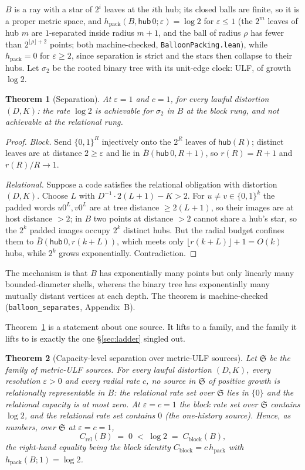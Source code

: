 \documentclass[11pt,reqno]{amsart}
\theoremstyle{plain}
\newtheorem{theorem}{Theorem}[section]
\theoremstyle{definition}
\newcommand{\hpack}{h_{\mathrm{pack}}}
\newcommand{\Crel}{C_{\mathrm{rel}}}
\newcommand{\Cblock}{C_{\mathrm{block}}}
\newcommand{\eps}{\varepsilon}
\begin{document}
$B$ is a ray with a star of $2^i$ leaves at the $i$th hub; its closed balls are finite, so it is a proper metric space, and $\hpack(B,\mathsf{hub}\,0;\eps)=\log2$ for $\eps\le1$ (the $2^m$ leaves of hub $m$ are $1$-separated inside radius $m+1$, and the ball of radius $\rho$ has fewer than $2^{\lfloor\rho\rfloor+2}$ points; both machine-checked, \texttt{BalloonPacking.lean}), while $\hpack=0$ for $\eps\ge2$, since separation is strict and the stars then collapse to their hubs. Let $\sigma_2$ be the rooted binary tree with its unit-edge clock: ULF, of growth $\log2$.

\begin{theorem}[Separation]\label{thm:sep}
At $\eps=1$ and $c=1$, for every lawful distortion $(D,K)$: the rate $\log2$ is achievable for $\sigma_2$ in $B$ at the block rung, and not achievable at the relational rung.
\end{theorem}

\begin{proof}
\emph{Block.} Send $\{0,1\}^R$ injectively onto the $2^R$ leaves of $\mathsf{hub}(R)$; distinct leaves are at distance $2\ge\eps$ and lie in $\bar B(\mathsf{hub}\,0,R+1)$, so $r(R)=R+1$ and $r(R)/R\to1$.

\emph{Relational.} Suppose a code satisfies the relational obligation with distortion $(D,K)$. Choose $L$ with $D^{-1}\cdot2(L+1)-K>2$. For $u\ne v\in\{0,1\}^k$ the padded words $u0^L,v0^L$ are at tree distance $\ge2(L+1)$, so their images are at host distance $>2$; in $B$ two points at distance $>2$ cannot share a hub's star, so the $2^k$ padded images occupy $2^k$ distinct hubs. But the radial budget confines them to $\bar B(\mathsf{hub}\,0,r(k+L))$, which meets only $\lfloor r(k+L)\rfloor+1=O(k)$ hubs, while $2^k$ grows exponentially. Contradiction.
\end{proof}

The mechanism is that $B$ has exponentially many points but only linearly many bounded-diameter shells, whereas the binary tree has exponentially many mutually distant vertices at each depth. The theorem is machine-checked (\texttt{balloon\_\allowbreak{}separates}, Appendix~B).

Theorem~\ref{thm:sep} is a statement about one source. It lifts to a family, and the family it lifts to is exactly the one \S\ref{sec:ladder} singled out.

\begin{theorem}[Capacity-level separation over metric-ULF sources]\label{thm:sepcap}
Let $\mathfrak S$ be the family of metric-ULF sources. For every lawful distortion $(D,K)$, every resolution $\eps>0$ and every radial rate $c$, no source in $\mathfrak S$ of positive growth is relationally representable in $B$: the relational rate set over $\mathfrak S$ lies in $\{0\}$ and the relational capacity is at most zero. At $\eps=c=1$ the block rate set over $\mathfrak S$ contains $\log2$, and the relational rate set contains $0$ (the one-history source). Hence, as numbers, over $\mathfrak S$ at $\eps=c=1$,
\[
\Crel(B)\;=\;0\;<\;\log2\;=\;\Cblock(B),
\]
the right-hand equality being the block identity $\Cblock=c\,\hpack$ with $\hpack(B;1)=\log2$.
\end{theorem}
\end{document}
